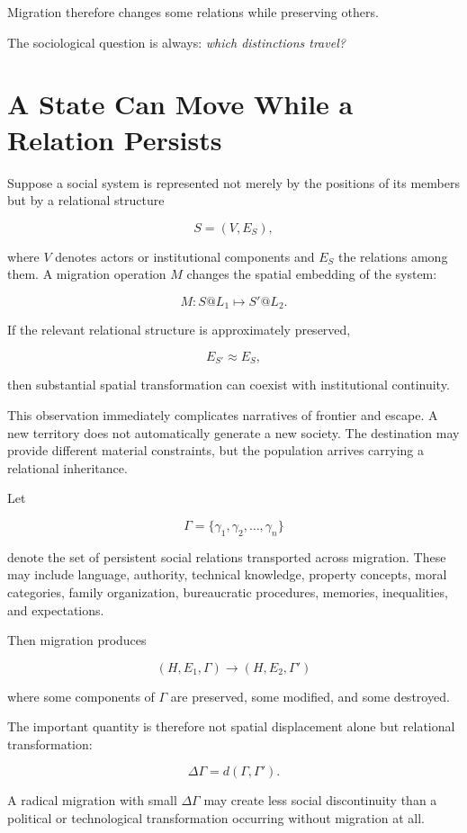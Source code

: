 \documentclass[11pt,oneside]{book}
\theoremstyle{definition}
\theoremstyle{remark}
\begin{document}
Migration therefore changes some relations while preserving others.

The sociological question is always: \emph{which distinctions travel?}

\section{A State Can Move While a Relation Persists}

Suppose a social system is represented not merely by the positions of its members but by a relational structure

\[
S=(V,E_S),
\]

where \(V\) denotes actors or institutional components and \(E_S\) the relations among them. A migration operation \(M\) changes the spatial embedding of the system:

\[
M:S@L_1\mapsto S'@L_2.
\]

If the relevant relational structure is approximately preserved,

\[
E_{S'}\approx E_S,
\]

then substantial spatial transformation can coexist with institutional continuity.

This observation immediately complicates narratives of frontier and escape. A new territory does not automatically generate a new society. The destination may provide different material constraints, but the population arrives carrying a relational inheritance.

Let

\[
\Gamma
=
\{
\gamma_1,\gamma_2,\ldots,\gamma_n
\}
\]

denote the set of persistent social relations transported across migration. These may include language, authority, technical knowledge, property concepts, moral categories, family organization, bureaucratic procedures, memories, inequalities, and expectations.

Then migration produces

\[
(H,E_1,\Gamma)
\longrightarrow
(H,E_2,\Gamma')
\]

where some components of \(\Gamma\) are preserved, some modified, and some destroyed.

The important quantity is therefore not spatial displacement alone but relational transformation:

\[
\Delta\Gamma
=
d(\Gamma,\Gamma').
\]

A radical migration with small \(\Delta\Gamma\) may create less social discontinuity than a political or technological transformation occurring without migration at all.
\end{document}
